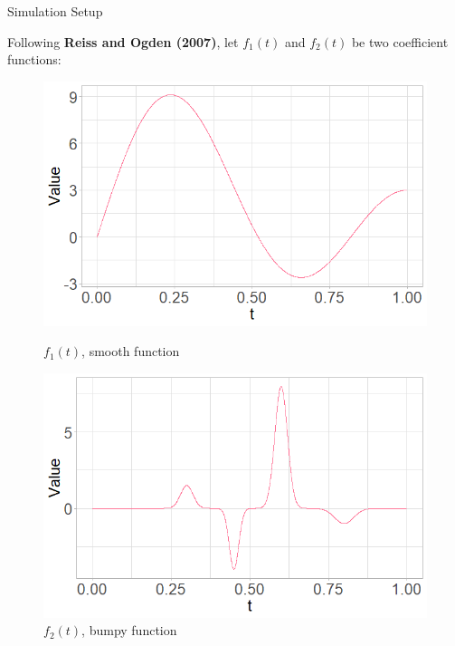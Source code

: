 \documentclass{beamer}
\begin{document}
	
	\begin{frame}{Simulation Setup}

		Following \textbf{Reiss and Ogden (2007)}, let $f_1(t)$ and $f_2(t)$ be two coefficient functions: 

		\vspace{0.1cm}
		\begin{figure}
			\centering
			\begin{minipage}{.5\textwidth}
				\centering
  				\includegraphics[width=\textwidth]{smooth_function.png}
  				\caption{$f_1(t)$, smooth function}
  				\label{fig:test1}
			\end{minipage}%
			\begin{minipage}{.5\textwidth}
	  			\centering
  				\includegraphics[width=\textwidth]{bumpy_function.png}
  				\caption{$f_2(t)$, bumpy function}
  				\label{fig:test2}
			\end{minipage}
		\end{figure}
		
	\end{frame}	
\end{document}
